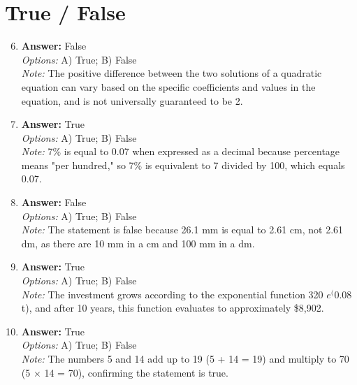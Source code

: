 \documentclass[12pt]{article}
\begin{document}
\section*{True / False}
\begin{enumerate}[label=\arabic*.]
\setcounter{enumi}{5}
\item \textbf{Answer:} False
\\ \textit{Options:} A) True; B) False
\\ \textit{Note:} The positive difference between the two solutions of a quadratic equation can vary based on the specific coefficients and values in the equation, and is not universally guaranteed to be 2.
\item \textbf{Answer:} True
\\ \textit{Options:} A) True; B) False
\\ \textit{Note:} 7\% is equal to 0.07 when expressed as a decimal because percentage means "per hundred," so 7\% is equivalent to 7 divided by 100, which equals 0.07.
\item \textbf{Answer:} False
\\ \textit{Options:} A) True; B) False
\\ \textit{Note:} The statement is false because 26.1 mm is equal to 2.61 cm, not 2.61 dm, as there are 10 mm in a cm and 100 mm in a dm.
\item \textbf{Answer:} True
\\ \textit{Options:} A) True; B) False
\\ \textit{Note:} The investment grows according to the exponential function 320 $e^(0$.08 t), and after 10 years, this function evaluates to approximately \$8,902.
\item \textbf{Answer:} True
\\ \textit{Options:} A) True; B) False
\\ \textit{Note:} The numbers 5 and 14 add up to 19 (5 + 14 = 19) and multiply to 70 (5 × 14 = 70), confirming the statement is true.
\end{enumerate}
\end{document}
